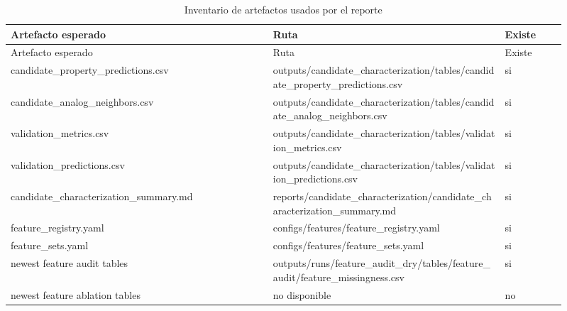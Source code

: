 \begin{longtable}{p{0.43\linewidth}p{0.38\linewidth}p{0.10\linewidth}}
\caption{Inventario de artefactos usados por el reporte}\label{tab:outputs-inventory}\\
\toprule
Artefacto esperado & Ruta & Existe \\
\midrule
\endfirsthead
\toprule
Artefacto esperado & Ruta & Existe \\
\midrule
\endhead
candidate\_property\_predictions.csv & outputs/candidate\_characterization/tables/candidate\_property\_predictions.csv & si \\
candidate\_analog\_neighbors.csv & outputs/candidate\_characterization/tables/candidate\_analog\_neighbors.csv & si \\
validation\_metrics.csv & outputs/candidate\_characterization/tables/validation\_metrics.csv & si \\
validation\_predictions.csv & outputs/candidate\_characterization/tables/validation\_predictions.csv & si \\
candidate\_characterization\_summary.md & reports/candidate\_characterization/candidate\_characterization\_summary.md & si \\
feature\_registry.yaml & configs/features/feature\_registry.yaml & si \\
feature\_sets.yaml & configs/features/feature\_sets.yaml & si \\
newest feature audit tables & outputs/runs/feature\_audit\_dry/tables/feature\_audit/feature\_missingness.csv & si \\
newest feature ablation tables & no disponible & no \\
\bottomrule
\end{longtable}
